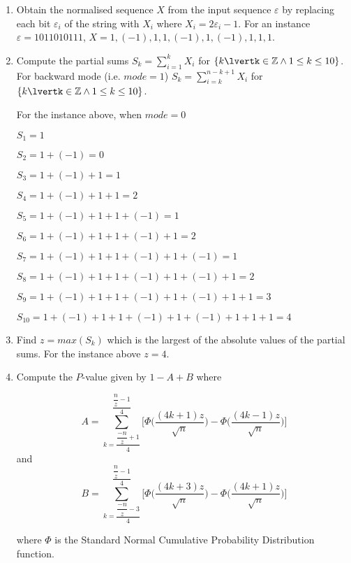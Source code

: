 \begin{enumerate}
    \item Obtain the normalised sequence $X$ from the input sequence $\varepsilon$ by replacing each bit $\varepsilon_i$ of the string with $X_i$ where $X_i=2\varepsilon_i-1$. For an instance $\varepsilon=1011010111$, $X=1, (-1), 1, 1, (-1), 1, (-1), 1, 1, 1$.
    
    \item Compute the partial sums $S_k=\sum_{i=1}^{k}X_i$ for $\{k\lvertk\in\mathbb{Z}\land 1 \leq k \leq 10\}$. For backward mode (i.e. $mode=1$) $S_k=\sum_{i=k}^{n-k+1}X_i$ for $\{k\lvertk\in\mathbb{Z}\land 1 \leq k \leq 10\}$.
    
    For the instance above, when $mode=0$
    
    \hfill\begin{minipage}{\dimexpr\textwidth-3cm}
    	$S_{1} = 1$
    	
    	$S_{2} = 1 + (-1) = 0$
    	
    	$S_{3} = 1 + (-1) + 1 = 1$
    	
    	$S_{4} = 1 + (-1) + 1 + 1 = 2$
    	
    	$S_{5} = 1 + (-1) + 1 + 1 + (-1) = 1$
    	
    	$S_{6} = 1 + (-1) + 1 + 1 + (-1) + 1 = 2$
    	
    	$S_{7} = 1 + (-1) + 1 + 1 + (-1) + 1 + (-1) = 1$
    	
    	$S_{8} = 1 + (-1) + 1 + 1 + (-1) + 1 + (-1) + 1 = 2$
    	
    	$S_{9} = 1 + (-1) + 1 + 1 + (-1) + 1 + (-1) + 1 + 1 = 3$
    	
    	$S_{10} = 1 + (-1) + 1 + 1 + (-1) + 1 + (-1) + 1 + 1 + 1 = 4$
    \xdef\tpd{\the\prevdepth}
    \end{minipage}
    
    \item Find $z=max(S_k)$ which is the largest of the absolute values of the partial sums. For the instance above $z=4$.
    
    \item Compute the $P$-value given by $1 - A + B$ where
    
    \[
        A = \sum_{k=\dfrac{\dfrac{-n}{z}+1}{4}}^{\dfrac{\dfrac{n}{z}-1}{4}}\Bigg[\Phi\Bigg(\dfrac{(4k+1)z}{\sqrt{n}}\Bigg) - \Phi\Bigg(\dfrac{(4k-1)z}{\sqrt{n}}\Bigg)\Bigg]
    \]
    and
    \[
        B = \sum_{k=\dfrac{\dfrac{-n}{z}-3}{4}}^{\dfrac{\dfrac{n}{z}-1}{4}}\Bigg[\Phi\Bigg(\dfrac{(4k+3)z}{\sqrt{n}}\Bigg) - \Phi\Bigg(\dfrac{(4k+1)z}{\sqrt{n}}\Bigg)\Bigg]
    \]
    
    where $\Phi$ is the Standard Normal Cumulative Probability Distribution function.
\end{enumerate}

